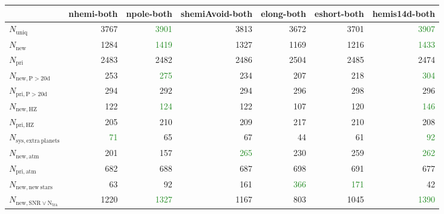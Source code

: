 \begin{tabular}{lrrrrrr}
\toprule
{} &  nhemi-both &  npole-both &  shemiAvoid-both &  elong-both &  eshort-both &  hemis14d-both \\
\midrule
$N_{\mathrm{uniq}}$                &        3767 &        \textcolor{ForestGreen}{3901} &             3813 &        3672 &         3701 &           \textcolor{ForestGreen}{3907} \\
$N_{\mathrm{new}}$                 &        1284 &        \textcolor{ForestGreen}{1419} &             1327 &        1169 &         1216 &           \textcolor{ForestGreen}{1433} \\
$N_{\mathrm{pri}}$                 &        2483 &        2482 &             2486 &        2504 &         2485 &           2474 \\
$N_{\mathrm{new,P>20d}}$           &         253 &         \textcolor{ForestGreen}{275} &              234 &         207 &          218 &            \textcolor{ForestGreen}{304} \\
$N_{\mathrm{pri,P>20d}}$           &         294 &         292 &              294 &         296 &          298 &            296 \\
$N_{\mathrm{new,HZ}}$              &         122 &         \textcolor{ForestGreen}{124} &              122 &         107 &          120 &            \textcolor{ForestGreen}{146} \\
$N_{\mathrm{pri,HZ}}$              &         205 &         210 &              209 &         217 &          210 &            208 \\
$N_{\mathrm{sys,extra\ planets}}$  &          \textcolor{ForestGreen}{71} &          65 &               67 &          44 &           61 &             \textcolor{ForestGreen}{92} \\
$N_{\mathrm{new,atm}}$             &         201 &         157 &              \textcolor{ForestGreen}{265} &         230 &          259 &            \textcolor{ForestGreen}{262} \\
$N_{\mathrm{pri,atm}}$             &         682 &         688 &              687 &         698 &          691 &            677 \\
$N_{\mathrm{new,new\ stars}}$      &          63 &          92 &              161 &         \textcolor{ForestGreen}{366} &          \textcolor{ForestGreen}{171} &             42 \\
$N_{\mathrm{new,SNR\lor N_{tra}}}$ &        1220 &        \textcolor{ForestGreen}{1327} &             1167 &         803 &         1045 &           \textcolor{ForestGreen}{1390} \\
\bottomrule
\end{tabular}

